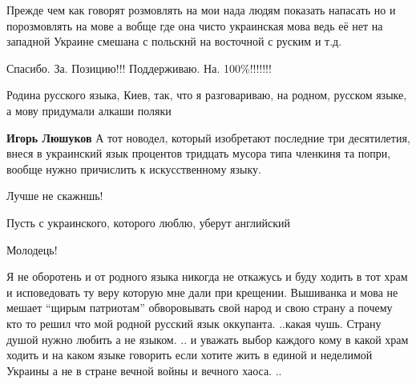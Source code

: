 \begin{itemize}
\begin{itemize}
\end{itemize}



Прежде чем как говорят розмовлять на мои нада людям показать напасать но и
порозмовлять на мове а вобще где она чисто украинская мова ведь её нет на
западной Украине смешана с польскнй на восточной с руским и т.д.


Спасибо. За. Позицию!!! Поддерживаю. На. 100\%!!!!!!!


Родина русского языка, Киев, так, что я разговариваю, на родном, русском языке, а мову придумали алкаши поляки

\begin{itemize}

\textbf{Игорь Люшуков} А тот новодел, который изобретают последние три
десятилетия, внеся в украинский язык процентов тридцать мусора типа членкиня та
попри, вообще нужно причислить к искусственному языку.
\end{itemize}


Лучше не скажншь!


Пусть с украинского, которого люблю, уберут английский


Молодець!


Я не оборотень и от родного языка никогда не откажусь и буду ходить в тот храм
и исповедовать ту веру которую мне дали при крещении. Вышиванка и мова не
мешает \enquote{щирым патриотам} обворовывать свой народ и свою страну а почему кто
то решил что мой родной русский язык оккупанта. ..какая чушь. Страну душой
нужно любить а не языком. .. и уважать выбор каждого кому в какой храм ходить и
на каком языке говорить если хотите жить в единой и неделимой Украины а не в
стране вечной войны и вечного хаоса. ..


\end{itemize}
